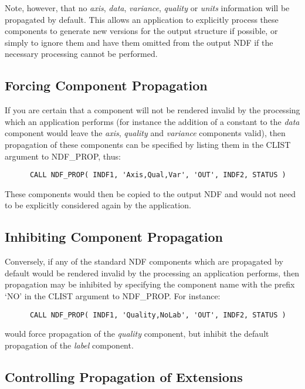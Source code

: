\documentclass[twoside,11pt]{article}
\newcommand{\htmlref}[2]{#1}
\newcommand{\xlabel}[1]{}
\newcommand{\st}[1]{{\em{#1}}}
\begin{document}
Note, however, that no \st{axis}, \st{data}, \st{variance}, \st{quality\/}
or \st{units\/} information will be propagated by default. 
This allows an application to explicitly process these components to
generate new versions for the output structure if possible, or simply to
ignore them and have them omitted from the output NDF if the necessary
processing cannot be performed. 

\subsection{\xlabel{forcing_component_propagation}Forcing Component Propagation}

If you are certain that a component will not be rendered invalid by the
processing which an application performs (for instance the addition of a
constant to the \st{data\/} component would leave the \st{axis},
\st{quality\/} and \st{variance\/} components valid), then
propagation of these 
components can be specified by listing them in the CLIST argument to
\htmlref{NDF\_PROP}{NDF_PROP}, thus: 

\small
\begin{verbatim}
      CALL NDF_PROP( INDF1, 'Axis,Qual,Var', 'OUT', INDF2, STATUS )
\end{verbatim}
\normalsize

These components would then be copied to the output NDF and would not need
to be explicitly considered again by the application. 

\subsection {Inhibiting Component Propagation}

Conversely, if any of the standard NDF components which are propagated by
default would be rendered invalid by the processing an application performs,
then propagation may be inhibited by specifying the component name with the
prefix `NO' in the CLIST argument to NDF\_PROP. 
For instance:

\small
\begin{verbatim}
      CALL NDF_PROP( INDF1, 'Quality,NoLab', 'OUT', INDF2, STATUS )
\end{verbatim}
\normalsize

would force propagation of the \st{quality\/} component, but inhibit the
default propagation of the \st{label\/} component. 

\subsection{\xlabel{controlling_propagation_of_extensions}\label{ss:propagatingextensions}Controlling Propagation of Extensions}
\end{document}
